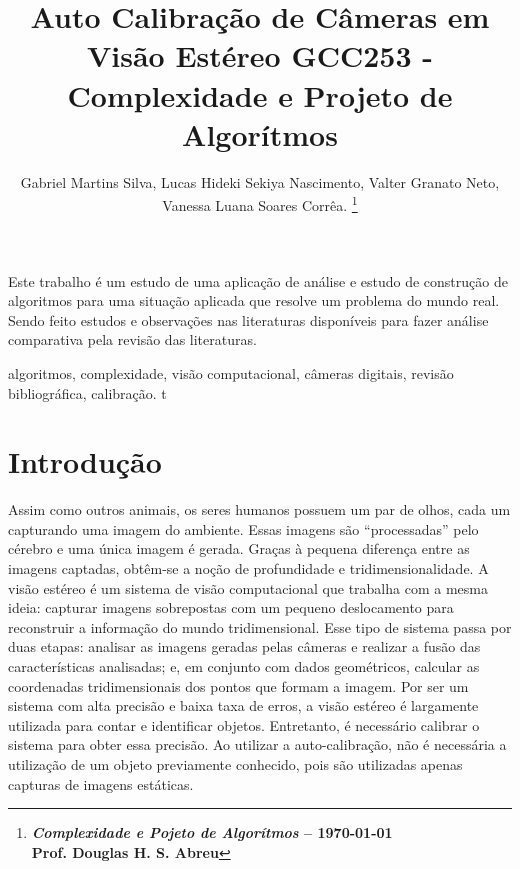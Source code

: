 \documentclass[portuguese]{sbrt}
\begin{document}
 
  
\title{Auto Calibração de Câmeras em Visão Estéreo GCC253 - Complexidade e Projeto de Algorítmos} 
  
\author{Gabriel Martins Silva, Lucas Hideki Sekiya Nascimento, Valter Granato Neto, Vanessa Luana Soares Corrêa. 
\thanks{\centering \textbf{\textit{Complexidade e Pojeto de Algorítmos} -- \today \\ Prof. Douglas H. S. Abreu}}%
} 
  
\maketitle 

  
  
  
  
\begin{resumo} 
Este trabalho é um estudo de uma aplicação de análise e estudo de construção de algoritmos para uma situação aplicada que resolve um problema do mundo real. Sendo feito estudos e observações nas literaturas disponíveis para fazer análise comparativa pela revisão das literaturas.  
\end{resumo} 
\begin{chave} 
algoritmos, complexidade, visão computacional, câmeras digitais, revisão bibliográfica, calibração. t 
\end{chave} 
  

  
  

\section{Introdução} 
\label{sec:introducao} 
  
Assim como outros animais, os seres humanos possuem um par de olhos, cada um capturando uma imagem do ambiente. Essas imagens são “processadas” pelo cérebro e uma única imagem é gerada. Graças à pequena diferença entre as imagens captadas, obtêm-se a noção de profundidade e tridimensionalidade. A visão estéreo é um sistema de visão computacional que trabalha com a mesma ideia: capturar imagens sobrepostas com um pequeno deslocamento para reconstruir a informação do mundo tridimensional.
Esse tipo de sistema passa por duas etapas: analisar as imagens geradas pelas câmeras e realizar a fusão das características analisadas; e, em conjunto com dados geométricos, calcular as coordenadas tridimensionais dos pontos que formam a imagem.
Por ser um sistema com alta precisão e baixa taxa de erros, a visão estéreo é largamente utilizada para contar e identificar objetos. Entretanto, é necessário calibrar o sistema para obter essa precisão. Ao utilizar a auto-calibração, não é necessária a utilização de um objeto previamente conhecido, pois são utilizadas apenas capturas de imagens estáticas.
~\cite{cormen:2009}
\end{document}

